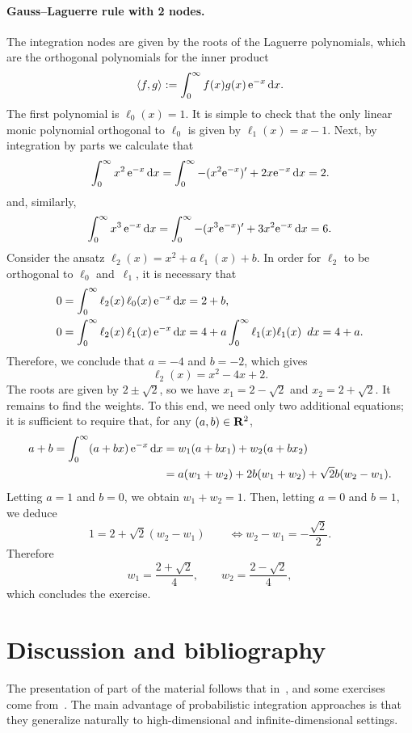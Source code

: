 \begin{solution}
    \paragraph{Gauss--Laguerre rule with 2 nodes.}
    The integration nodes are given by the roots of the Laguerre polynomials,
    which are the orthogonal polynomials for the inner product
    \[
        \langle f, g\rangle :=
        \int_{0}^{\infty} f(x) g(x) \, \mathrm e^{-x} \, \mathrm d x.
    \]
    The first polynomial is $\ell_0(x) = 1$.
    It is simple to check that the only linear monic polynomial orthogonal to $\ell_0$ is given by $\ell_1(x) = x - 1$.
    Next, by integration by parts we calculate that
    \[
        \int_{0}^{\infty} x^2 \, \mathrm e^{-x} \, \mathrm d x
        = \int_{0}^{\infty} - (x^2 \mathrm e^{-x})' + 2 x \mathrm e^{-x} \, \mathrm d x = 2.
    \]
    and, similarly,
    \[
        \int_{0}^{\infty} x^3 \, \mathrm e^{-x} \, \mathrm d x
        = \int_{0}^{\infty} - (x^3 \mathrm e^{-x})' + 3 x^2 \mathrm e^{-x} \, \mathrm d x = 6.
    \]
    Consider the ansatz $\ell_2(x) = x^2 + a \ell_1(x) + b$.
    In order for $\ell_2$ to be orthogonal to $\ell_0$ and~$\ell_1$,
    it is necessary that
    \begin{align*}
        0 &= \int_{0}^{\infty} \ell_{2}(x) \, \ell_0(x) \, \mathrm e^{-x} \, \mathrm d x = 2 + b, \\
        0 &= \int_{0}^{\infty} \ell_{2}(x) \, \ell_1(x) \, \mathrm e^{-x} \, \mathrm d x
        = 4 + a \int_{0}^{\infty} \ell_1(x) \ell_1(x) \, \ d x = 4 + a.
    \end{align*}
    Therefore, we conclude that $a = -4$ and $b=-2$,
    which gives
    \[
        \ell_2(x) = x^2 - 4 x + 2.
    \]
    The roots are given by $2 \pm \sqrt{2}$,
    so we have $x_1 = 2 - \sqrt{2}$ and $x_2 = 2 + \sqrt{2}$.
    It remains to find the weights.
    To this end, we need only two additional equations;
    it is sufficient to require that, for any $(a,b) \in \mathbf R^2$,
    \begin{align*}
        a + b =
            \int_{0}^{\infty} (a + bx) \, \mathrm e^{-x} \, \mathrm d x
    &= w_1 (a + b x_1) + w_2 (a + b x_2) \\
    &= a (w_1 + w_2) + 2 b (w_1 + w_2) + \sqrt{2} b (w_2 - w_1).
    \end{align*}
    Letting $a = 1$ and $b = 0$,
    we obtain $w_1 + w_2 = 1$.
    Then, letting $a = 0$ and $b = 1$,
    we deduce
    \[
        1 = 2 + \sqrt{2} (w_2 - w_1) \qquad \Leftrightarrow w_2 - w_1 = - \frac{\sqrt{2}}{2}.
    \]
    Therefore
    \[
        w_1 = \frac{2 + \sqrt{2}}{4}, \qquad w_2 = \frac{2 - \sqrt{2}}{4},
    \]
    which concludes the exercise.
\end{solution}


\section{Discussion and bibliography}
The presentation of part of the material follows that in~\cite{Legat},
and some exercises come from~\cite[Chapter 9]{MR2265914}.
The main advantage of probabilistic integration approaches is that
they generalize naturally to high-dimensional and infinite-dimensional settings.
